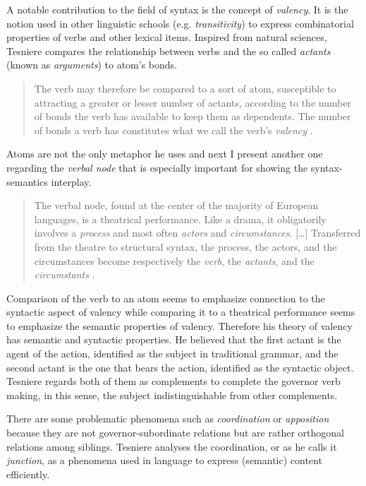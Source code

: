 A notable contribution to the field of syntax is the concept of \textit{valency}. It is the notion used in other linguistic schools (e.g. \textit{transitivity}) to express combinatorial properties of verbs and other lexical items. Inspired from natural sciences, Tesniere compares the relationship between verbs and the so called \textit{actants} (known as \textit{arguments}) to atom's bonds. 

\begin{quotation}
    The verb may therefore be compared to a sort of atom, susceptible to attracting a greater or lesser number of actants, according to the number of bonds the verb has available to keep them as dependents. The number of bonds a verb has constitutes what we call the verb’s \textit{valency} \citep[241]{Tesniere2015}.
\end{quotation}

Atoms are not the only metaphor he uses and next I present another one regarding the \textit{verbal node} that is especially important for showing the syntax-semantics interplay. 

\begin{quotation}
     The verbal node, found at the center of the majority of European languages, is a theatrical performance. Like a drama, it obligatorily involves a \textit{process} and most often \textit{actors} and \textit{circumstances}. [\dots] Transferred from the theatre to structural syntax, the process, the actors, and the circumstances become respectively the \textit{verb}, the \textit{actants}, and the \textit{circumstants} \citep[97]{Tesniere2015}.
\end{quotation}

Comparison of the verb to an atom seems to emphasize connection to the syntactic aspect of valency while comparing it to a theatrical performance seems to emphasize the semantic properties of valency. Therefore his theory of valency has semantic and syntactic properties. He believed that the first actant is the agent of the action, identified as the subject in traditional grammar, and the second actant is the one that bears the action, identified as the syntactic object. Tesniere regards both of them as complements to complete the governor verb making, in this sense, the subject indistinguishable from other complements. 

There are some problematic phenomena such as \textit{coordination} or \textit{apposition} because they are not governor-subordinate relations but are rather orthogonal relations among siblings. Tesniere analyses the coordination, or as he calls it \textit{junction}, as a phenomena used in language to express (semantic) content efficiently. 

